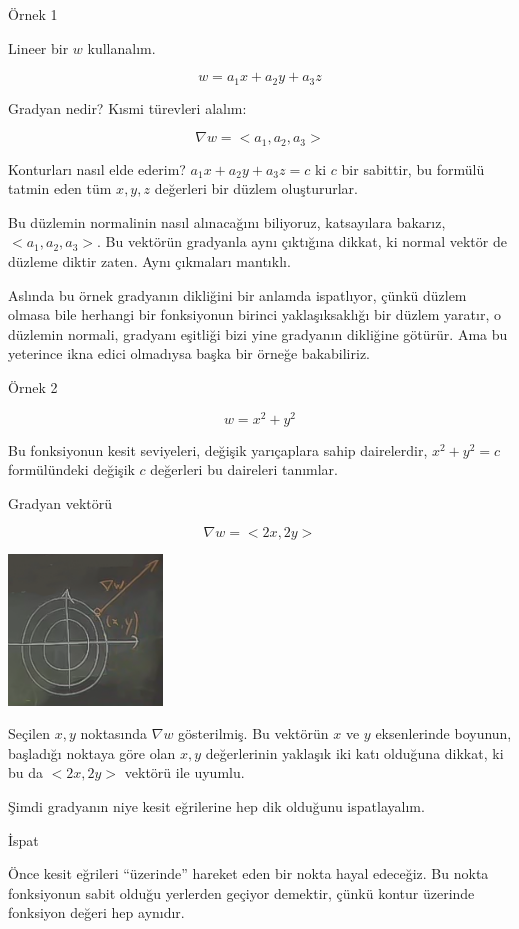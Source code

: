 \documentclass[12pt,fleqn]{article}\usepackage{../../common}
\begin{document}
Örnek 1

Lineer bir $w$ kullanalım. 

$$ w = a_1 x + a_2 y + a_3 z $$

Gradyan nedir? Kısmi türevleri alalım:

$$
\nabla w = < a_1, a_2, a_3 >
$$

Konturları nasıl elde ederim? $a_1 x + a_2 y + a_3 z  = c$ ki $c$ bir
sabittir, bu formülü tatmin eden tüm $x,y,z$ değerleri bir düzlem
oluştururlar. 

Bu düzlemin normalinin nasıl alınacağını biliyoruz, katsayılara bakarız, $<
a_1,a_2,a_3 >$. Bu vektörün gradyanla aynı çıktığına dikkat, ki normal vektör de
düzleme diktir zaten. Aynı çıkmaları mantıklı.

Aslında bu örnek gradyanın dikliğini bir anlamda ispatlıyor, çünkü düzlem olmasa
bile herhangi bir fonksiyonun birinci yaklaşıksaklığı bir düzlem yaratır, o
düzlemin normali, gradyanı eşitliği bizi yine gradyanın dikliğine götürür. Ama
bu yeterince ikna edici olmadıysa başka bir örneğe bakabiliriz.

Örnek 2

$$ w = x^2 + y^2 $$

Bu fonksiyonun kesit seviyeleri, değişik yarıçaplara sahip dairelerdir,
$x^2 + y^2 = c$ formülündeki değişik $c$ değerleri bu daireleri tanımlar. 

Gradyan vektörü


$$ \nabla w = <2x, 2y> $$
\begin{center}
\includegraphics[height=4cm]{12_2.png}
\end{center}
Seçilen $x,y$ noktasında $\nabla w$ gösterilmiş. Bu vektörün $x$ ve $y$
eksenlerinde boyunun, başladığı noktaya göre olan $x,y$ değerlerinin
yaklaşık iki katı olduğuna dikkat, ki bu da $<2x,2y>$ vektörü ile uyumlu. 

Şimdi gradyanın niye kesit eğrilerine hep dik olduğunu ispatlayalım.

İspat

Önce kesit eğrileri ``üzerinde'' hareket eden bir nokta hayal edeceğiz. Bu
nokta fonksiyonun sabit olduğu yerlerden geçiyor demektir, çünkü kontur
üzerinde fonksiyon değeri hep aynıdır. 
\end{document}
